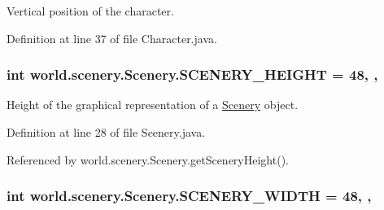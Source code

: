 Vertical position of the character. 



Definition at line 37 of file Character.\-java.

\hypertarget{classworld_1_1scenery_1_1_scenery_a106e53ae6e1647395740237ccce7f363}{
\subsubsection[{S\-C\-E\-N\-E\-R\-Y\-\_\-\-H\-E\-I\-G\-H\-T}]{\setlength{\rightskip}{0pt plus 5cm}int world.\-scenery.\-Scenery.\-S\-C\-E\-N\-E\-R\-Y\-\_\-\-H\-E\-I\-G\-H\-T = 48\hspace{0.3cm}{\ttfamily [static]}, {\ttfamily [protected]}, {\ttfamily [inherited]}}}\label{classworld_1_1scenery_1_1_scenery_a106e53ae6e1647395740237ccce7f363}


Height of the graphical representation of a \hyperlink{classworld_1_1scenery_1_1_scenery}{Scenery} object. 



Definition at line 28 of file Scenery.\-java.



Referenced by world.\-scenery.\-Scenery.\-get\-Scenery\-Height().

\hypertarget{classworld_1_1scenery_1_1_scenery_affb047c028883c6d069a03ef0f1caeb8}{
\subsubsection[{S\-C\-E\-N\-E\-R\-Y\-\_\-\-W\-I\-D\-T\-H}]{\setlength{\rightskip}{0pt plus 5cm}int world.\-scenery.\-Scenery.\-S\-C\-E\-N\-E\-R\-Y\-\_\-\-W\-I\-D\-T\-H = 48\hspace{0.3cm}{\ttfamily [static]}, {\ttfamily [protected]}, {\ttfamily [inherited]}}}\label{classworld_1_1scenery_1_1_scenery_affb047c028883c6d069a03ef0f1caeb8}


